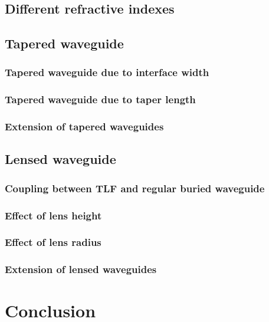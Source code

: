 \section{Different refractive indexes}


\section{Tapered waveguide}


\subsection{Tapered waveguide due to interface width} 


\subsection{Tapered waveguide due to taper length}


\subsection{Extension of tapered waveguides}
\label{sect:optim_tapered_ext}


\section{Lensed waveguide}


\subsection{Coupling between TLF and regular buried waveguide}
\label{sect:optim_lensed_regular}


\subsection{Effect of lens height}
\label{sect:optim_lensed_height}

%
\subsection{Effect of lens radius}


\subsection{Extension of lensed waveguides}
\label{sect:optim_lensed_ext}

%
\chapter{Conclusion}










%



